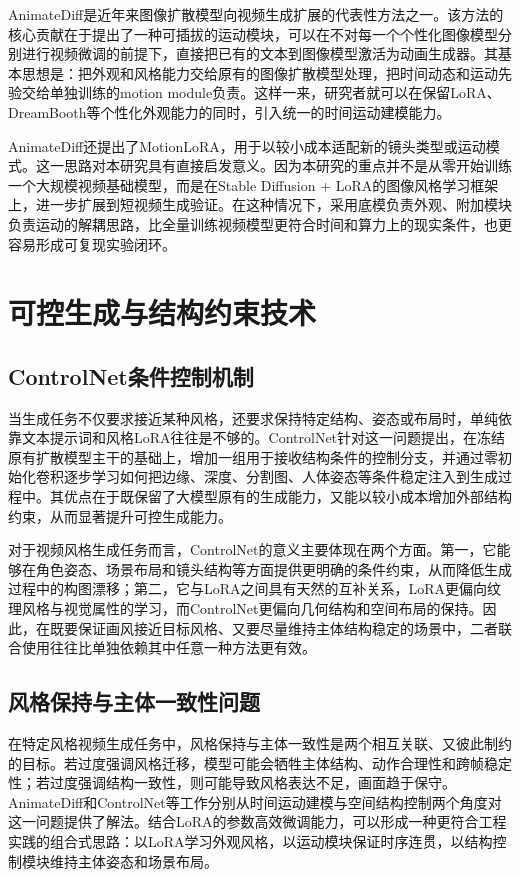 AnimateDiff\cite{ref12}是近年来图像扩散模型向视频生成扩展的代表性方法之一。该方法的核心贡献在于提出了一种可插拔的运动模块，可以在不对每一个个性化图像模型分别进行视频微调的前提下，直接把已有的文本到图像模型激活为动画生成器。其基本思想是：把外观和风格能力交给原有的图像扩散模型处理，把时间动态和运动先验交给单独训练的motion module负责。这样一来，研究者就可以在保留LoRA、DreamBooth等个性化外观能力的同时，引入统一的时间运动建模能力。

AnimateDiff还提出了MotionLoRA，用于以较小成本适配新的镜头类型或运动模式\cite{ref9}。这一思路对本研究具有直接启发意义。因为本研究的重点并不是从零开始训练一个大规模视频基础模型，而是在Stable Diffusion + LoRA的图像风格学习框架上，进一步扩展到短视频生成验证。在这种情况下，采用底模负责外观、附加模块负责运动的解耦思路，比全量训练视频模型更符合时间和算力上的现实条件，也更容易形成可复现实验闭环。

\section{可控生成与结构约束技术}

\subsection{ControlNet条件控制机制}

当生成任务不仅要求接近某种风格，还要求保持特定结构、姿态或布局时，单纯依靠文本提示词和风格LoRA往往是不够的。ControlNet\cite{ref14}针对这一问题提出，在冻结原有扩散模型主干的基础上，增加一组用于接收结构条件的控制分支，并通过零初始化卷积逐步学习如何把边缘、深度、分割图、人体姿态等条件稳定注入到生成过程中。其优点在于既保留了大模型原有的生成能力，又能以较小成本增加外部结构约束，从而显著提升可控生成能力。

对于视频风格生成任务而言，ControlNet的意义主要体现在两个方面。第一，它能够在角色姿态、场景布局和镜头结构等方面提供更明确的条件约束，从而降低生成过程中的构图漂移；第二，它与LoRA之间具有天然的互补关系，LoRA更偏向纹理风格与视觉属性的学习，而ControlNet更偏向几何结构和空间布局的保持\cite{ref14}。因此，在既要保证画风接近目标风格、又要尽量维持主体结构稳定的场景中，二者联合使用往往比单独依赖其中任意一种方法更有效。

\subsection{风格保持与主体一致性问题}

在特定风格视频生成任务中，风格保持与主体一致性是两个相互关联、又彼此制约的目标。若过度强调风格迁移，模型可能会牺牲主体结构、动作合理性和跨帧稳定性；若过度强调结构一致性，则可能导致风格表达不足，画面趋于保守。AnimateDiff\cite{ref12}和ControlNet\cite{ref14}等工作分别从时间运动建模与空间结构控制两个角度对这一问题提供了解法。结合LoRA的参数高效微调能力，可以形成一种更符合工程实践的组合式思路：以LoRA学习外观风格，以运动模块保证时序连贯，以结构控制模块维持主体姿态和场景布局。

